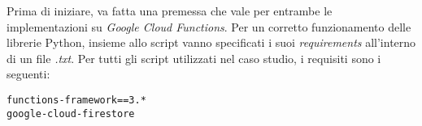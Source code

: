 Prima di iniziare, va fatta una premessa che vale per entrambe le implementazioni su \textit{Google Cloud Functions}. Per un corretto funzionamento delle librerie Python, insieme allo script vanno specificati i suoi \textit{requirements} all'interno di un file \textit{.txt}. Per tutti gli script utilizzati nel caso studio, i requisiti sono i seguenti:
\begin{lstlisting}
functions-framework==3.*
google-cloud-firestore
\end{lstlisting}